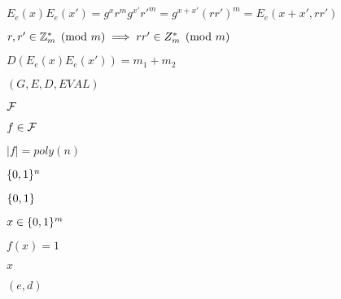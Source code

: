 \documentclass[10pt]{book}
\begin{document}
\begin{mdSnippets}
\begin{mdInlineSnippet}[62595564bd618f6d34a48b28aa849645]
$E_e(x)E_e(x') = g^xr^mg^{x'}r'^m = g^{x + x'}(rr')^{m} = E_e(x+x',rr')$\end{mdInlineSnippet}%
\begin{mdInlineSnippet}[4fae73fc3441f08d34fd57e19d57c972]%
$r,r' \in \mathbb{Z}_m^{*} \pmod m \implies rr' \in Z_m^{*} \pmod m$\end{mdInlineSnippet}%
\begin{mdInlineSnippet}[1c529b14709cb27c13c6f67733611054]%
$D(E_e(x)E_e(x')) = m_1 + m_2$\end{mdInlineSnippet}%
\begin{mdInlineSnippet}[46592e75c4ffdb3b47e10ce34c01f2dd]%
$(G,E,D,EVAL)$\end{mdInlineSnippet}%
\begin{mdInlineSnippet}[1fcbdba51d6716ce8e2de1fb4c5e148c]%
$\mathcal{F}$\end{mdInlineSnippet}%
\begin{mdInlineSnippet}%
$f\in\mathcal{F}$\end{mdInlineSnippet}%
\begin{mdInlineSnippet}%
$|f|=poly(n)$\end{mdInlineSnippet}%
\begin{mdInlineSnippet}[5867c9b098884eca2779f6d98d4b0b29]%
$\{0,1\}^n$\end{mdInlineSnippet}%
\begin{mdInlineSnippet}[69d364206d67dcdb68878f093fc16950]%
$\{0,1\}$\end{mdInlineSnippet}%
\begin{mdInlineSnippet}[df25cc47cf4002e6662f27d7d5eeeda2]%
$x\in\{0,1\}^m$\end{mdInlineSnippet}%
\begin{mdInlineSnippet}[546e912f7f43b2233ac97a4ecf33883e]%
$f(x)=1$\end{mdInlineSnippet}%
\begin{mdInlineSnippet}[9dd4e461268c8034f5c8564e155c67a6]%
$x$\end{mdInlineSnippet}%
\begin{mdInlineSnippet}%
$(e,d)$\end{mdInlineSnippet}%
\begin{mdInlineSnippet}[e1671797c52e15f763380b45e841ec32]%

\end{mdInlineSnippet}
\end{mdSnippets}
\end{document}
